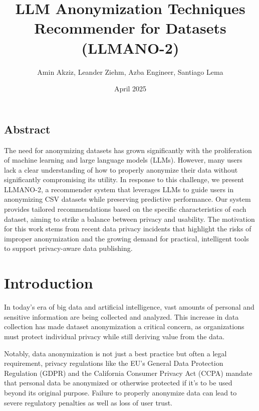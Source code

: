 \documentclass{article}
\title{LLM Anonymization Techniques Recommender for Datasets (LLMANO-2)}
\author{Amin Akziz, Leander Ziehm, Azba Engineer, Santiago Lema}
\date{April 2025}
\begin{document}
\maketitle

\begin{center}
\begin{minipage}{0.85\textwidth}
\section*{Abstract}
The need for anonymizing datasets has grown significantly with the proliferation of machine learning and large language models (LLMs). However, many users lack a clear understanding of how to properly anonymize their data without significantly compromising its utility. In response to this challenge, we present LLMANO-2, a recommender system that leverages LLMs to guide users in anonymizing CSV datasets while preserving predictive performance. Our system provides tailored recommendations based on the specific characteristics of each dataset, aiming to strike a balance between privacy and usability. The motivation for this work stems from recent data privacy incidents that highlight the risks of improper anonymization and the growing demand for practical, intelligent tools to support privacy-aware data publishing.
\end{minipage}
\end{center}

\section{Introduction}

In today’s era of big data and artificial intelligence, vast amounts of personal and sensitive information are being collected and analyzed. This increase in data collection has made dataset anonymization a critical concern, as organizations must protect individual privacy while still deriving value from the data. 

Notably, data anonymization is not just a best practice but often a legal requirement, privacy regulations like the EU’s General Data Protection Regulation (GDPR) and the California Consumer Privacy Act (CCPA) mandate that personal data be anonymized or otherwise protected if it’s to be used beyond its original purpose. Failure to properly anonymize data can lead to severe regulatory penalties as well as loss of user trust.
\end{document}
